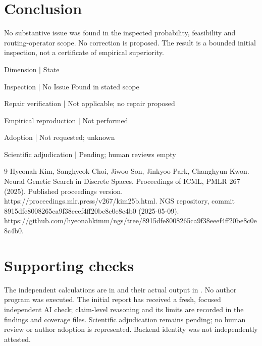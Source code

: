 \documentclass[10pt]{article}
\begin{document}
\section*{Conclusion}
No substantive issue was found in the inspected probability, feasibility and routing-operator scope. No correction is proposed. The result is a bounded initial inspection, not a certificate of empirical superiority.\par
Dimension | State\par
Inspection | No Issue Found in stated scope\par
Repair verification | Not applicable; no repair proposed\par
Empirical reproduction | Not performed\par
Adoption | Not requested; unknown\par
Scientific adjudication | Pending; human reviews empty\par
9 Hyeonah Kim, Sanghyeok Choi, Jiwoo Son, Jinkyoo Park, Changhyun Kwon. Neural Genetic Search in Discrete Spaces. Proceedings of ICML, PMLR 267 (2025). Published proceedings version. https://proceedings.mlr.press/v267/kim25b.html. NGS repository, commit 8915dfe8008265ca9f38eeef4ff20be8c0e8c4b0 (2025-05-09). https://github.com/hyeonahkimm/ngs/tree/8915dfe8008265ca9f38eeef4ff20be8c0e8c4b0.\par
\section*{Supporting checks}
The independent calculations are in and their actual output in . No author program was executed. The initial report has received a fresh, focused independent AI check; claim-level reasoning and its limits are recorded in the findings and coverage files. Scientific adjudication remains pending; no human review or author adoption is represented. Backend identity was not independently attested.\par
\end{document}
